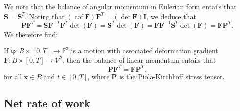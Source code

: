 \documentclass[
  letterpaper,
  DIV=11,
  numbers=noendperiod]{scrreprt}
\theoremstyle{plain}
\theoremstyle{remark}
\begin{document}
We note that the balance of angular momentum in Eulerian form entails
that \({\boldsymbol{S}}= {\boldsymbol{S}}^T\). Noting that
\(({\operatorname{cof}}{\boldsymbol{F}}){\boldsymbol{F}}^T = (\det{\boldsymbol{F}}){\boldsymbol{I}}\),
we deduce that
\[{\boldsymbol{P}}{\boldsymbol{F}}^T = {\boldsymbol{S}}{\boldsymbol{F}}^{-T}{\boldsymbol{F}}^T\det({\boldsymbol{F}}) = {\boldsymbol{S}}^T\det({\boldsymbol{F}}) = {\boldsymbol{F}}{\boldsymbol{F}}^{-1}{\boldsymbol{S}}^T\det({\boldsymbol{F}}) = {\boldsymbol{F}}{\boldsymbol{P}}^T.\]
We therefore find:

If \({\boldsymbol{\varphi}}:B\times[0,T]\to{\mathbb{E}}^3\) is a motion
with associated deformation gradient
\({\boldsymbol{F}}:B\times[0,T]\to{\mathcal{V}}^2\), then the balance of
linear momentum entails that
\[{\boldsymbol{P}}{\boldsymbol{F}}^T = {\boldsymbol{F}}{\boldsymbol{P}}^T.\]
for all \({\boldsymbol{x}}\in B\) and \(t\in[0,T]\), where
\({\boldsymbol{P}}\) is the Piola-Kirchhoff stress tensor.

\subsection{Net rate of work}\label{net-rate-of-work}
\end{document}
